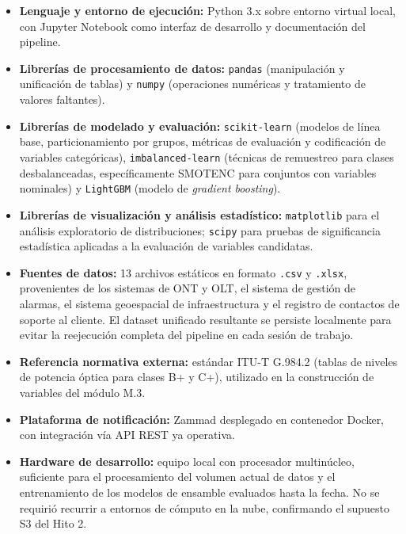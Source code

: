 \documentclass[12pt,a4paper]{article}
\begin{document}
\begin{itemize}
    \item \textbf{Lenguaje y entorno de ejecución:} Python 3.x sobre entorno virtual local, con Jupyter Notebook como interfaz de desarrollo y documentación del pipeline.
 
    \item \textbf{Librerías de procesamiento de datos:} \texttt{pandas} (manipulación y unificación de tablas) y \texttt{numpy} (operaciones numéricas y tratamiento de valores faltantes).
 
    \item \textbf{Librerías de modelado y evaluación:} \texttt{scikit-learn} (modelos de línea base, particionamiento por grupos, métricas de evaluación y codificación de variables categóricas), \texttt{imbalanced-learn} (técnicas de remuestreo para clases desbalanceadas, específicamente SMOTENC para conjuntos con variables nominales) y \texttt{LightGBM} (modelo de \textit{gradient boosting}).
 
    \item \textbf{Librerías de visualización y análisis estadístico:} \texttt{matplotlib} para el análisis exploratorio de distribuciones; \texttt{scipy} para pruebas de significancia estadística aplicadas a la evaluación de variables candidatas.
 
    \item \textbf{Fuentes de datos:} 13 archivos estáticos en formato \texttt{.csv} y \texttt{.xlsx}, provenientes de los sistemas de ONT y OLT, el sistema de gestión de alarmas, el sistema geoespacial de infraestructura y el registro de contactos de soporte al cliente. El dataset unificado resultante se persiste localmente para evitar la reejecución completa del pipeline en cada sesión de trabajo.
 
    \item \textbf{Referencia normativa externa:} estándar ITU-T G.984.2 (tablas de niveles de potencia óptica para clases B+ y C+), utilizado en la construcción de variables del módulo M.3.
 
    \item \textbf{Plataforma de notificación:} Zammad desplegado en contenedor Docker, con integración vía API REST ya operativa.
 
    \item \textbf{Hardware de desarrollo:} equipo local con procesador multinúcleo, suficiente para el procesamiento del volumen actual de datos y el entrenamiento de los modelos de ensamble evaluados hasta la fecha. No se requirió recurrir a entornos de cómputo en la nube, confirmando el supuesto S3 del Hito 2.
\end{itemize}
\end{document}
